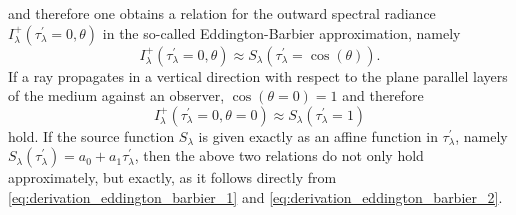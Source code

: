 \documentclass[a4paper,12pt]{report}
\begin{document}
\begin{align}
\begin{aligned}
\end{aligned}\end{align} and therefore one obtains a relation for the outward spectral radiance $I_\lambda^+(\tau_\lambda^\prime = 0,\theta)$ in the so-called Eddington-Barbier approximation, namely \begin{equation}
I_\lambda^+(\tau_\lambda^\prime = 0,\theta) \approx S_\lambda(\tau_\lambda^\prime = \cos(\theta)).
\end{equation} If a ray propagates in a vertical direction with respect to the plane parallel layers of the medium against an observer, $\cos(\theta=0) = 1$ and therefore \begin{equation}
I_\lambda^+(\tau_\lambda^\prime = 0, \theta=0) \approx S_\lambda(\tau_\lambda^\prime = 1)
\end{equation} hold. If the source function $S_\lambda$ is given exactly as an affine function in $\tau_\lambda^\prime$, namely $S_\lambda(\tau_\lambda^\prime) = a_0 + a_1\tau_\lambda^\prime$, then the above two relations do not only hold approximately, but exactly, as it follows directly from \cref{eq:derivation_eddington_barbier_1} and \cref{eq:derivation_eddington_barbier_2}.
\end{document}
